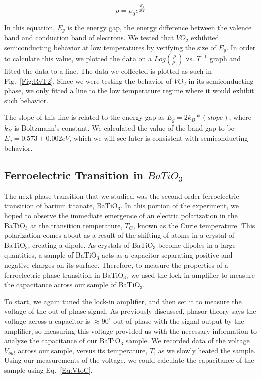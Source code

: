 \documentclass[%
 reprint,
 amsmath,amssymb,
 aps,
 pra,
]{revtex4-1}
\begin{document}
\begin{equation}\label{Eq:SemiEGap}
\rho = \rho_{0} e^{\frac{E_{g}}{2kT}}
\end{equation}

\noindent In this equation, $E_{g}$ is the energy gap, the energy difference between the valence band and conduction band of electrons. We tested that $VO_{2}$ exhibited semiconducting behavior at low temperatures by verifying the size of $E_{g}$. In order to calculate this value, we plotted the data on a $Log(\frac{\rho}{\rho_{0}})$ vs. $T^{-1}$ graph and fitted the data to a line. The data we collected is plotted as such in Fig.~\ref{Fig:RvT2}. Since we were testing the behavior of $VO_{2}$ in its semiconducting phase, we only fitted a line to the low temperature regime where it would exhibit such behavior.

The slope of this line is related to the energy gap as $E_{g} = 2k_B*(slope)$, where $k_B$ is Boltzmann's constant. We calculated the value of the band gap to be $E_{g} = 0.573 \pm 0.002 eV$, which we will see later is consistent with semiconducting behavior.

\subsection{Ferroelectric Transition in $BaTiO_{3}$}

The next phase transition that we studied was the second order ferroelectric transition of barium titanate, BaTiO$_{3}$. In this portion of the experiment, we hoped to observe the immediate emergence of an electric polarization in the BaTiO$_{3}$ at the transition temperature, $T_{C}$, known as the Curie temperature. This polarization comes about as a result of the shifting of atoms in a crystal of BaTiO$_{3}$, creating a dipole. As crystals of BaTiO$_{3}$ become dipoles in a large quantities, a sample of BaTiO$_{3}$ acts as a capacitor separating positive and negative charges on its surface. Therefore, to measure the properties of a ferroelectric phase transition in BaTiO$_{3}$, we used the lock-in amplifier to measure the capacitance across our sample of BaTiO$_{3}$.

To start, we again tuned the lock-in amplifier, and then set it to measure the voltage of the out-of-phase signal. As previously discussed, phasor theory says the voltage across a capacitor is $\approx 90^\circ$ out of phase with the signal output by the amplifier, so measuring this voltage provided us with the necessary information to analyze the capacitance of our BaTiO$_{3}$ sample. We recorded data of the voltage $V_{out}$ across our sample, versus its temperature, $T$, as we slowly heated the sample. Using our measurements of the voltage, we could calculate the capacitance of the sample using Eq.~\ref{Eq:VtoC}.
\end{document}

